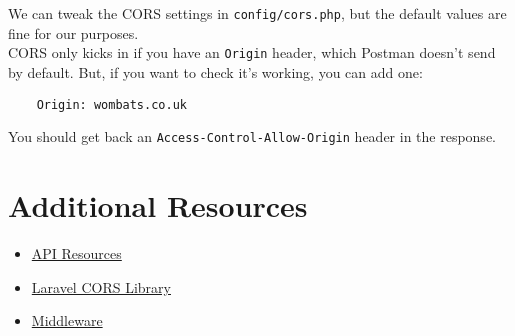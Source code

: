We can tweak the CORS settings in \texttt{config/cors.php}, but the default values are fine for our purposes.
\\

CORS only kicks in if you have an \texttt{Origin} header, which Postman doesn't send by default. But, if you want to check it's working, you can add one:

\begin{verbatim}
    Origin: wombats.co.uk
\end{verbatim}

You should get back an \texttt{Access-Control-Allow-Origin} header in the response.



\section{Additional Resources}

\begin{itemize}[leftmargin=*]
    \item \href{https://laravel.com/docs/master/eloquent-resources}{API Resources}
    \item \href{https://github.com/barryvdh/laravel-cors}{Laravel CORS Library}
    \item \href{http://laravel.com/docs/master/middleware}{Middleware}
\end{itemize}
